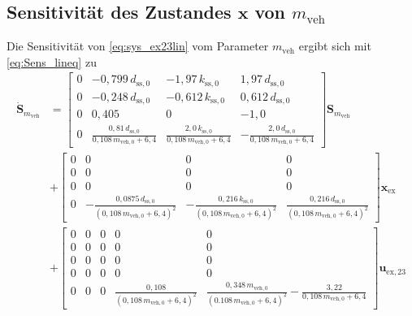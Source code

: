 \subsection{Sensitivität des Zustandes $\pmb{x}$ von $m_\mathrm{veh}$}
Die Sensitivität von \eqref{eq:sys_ex23lin} vom Parameter $m_\mathrm{veh}$ ergibt sich mit \eqref{eq:Sens_lineq} zu
\begin{align}
\dot{\pmb{S}}_{m_\mathrm{veh}} &= \begin{bmatrix} 0 & -0,799\, d_\mathrm{ss,0} & -1,97\, k_\mathrm{ss,0} & 1,97\, d_\mathrm{ss,0} \\ 0 & -0,248\, d_\mathrm{ss,0} & -0,612\, k_\mathrm{ss,0} & 0,612\, d_\mathrm{ss,0} \\ 0 & 0,405 & 0 & -1,0 \\ 0 & \frac{0,81\, d_\mathrm{ss,0}}{0,108 \, m_\mathrm{veh,0} + 6,4} & \frac{2,0\, k_\mathrm{ss,0}}{0,108\, m_\mathrm{veh,0} + 6,4} & -\frac{2,0\, d_\mathrm{ss,0}}{0,108\, m_\mathrm{veh,0}+6,4}\end{bmatrix} \pmb{S}_{m_\mathrm{veh}}\\
&+\begin{bmatrix} 0 & 0 & 0 & 0\\ 0 & 0 & 0 & 0\\ 0 & 0 & 0 & 0\\ 0 & -\frac{0,0875\, d_\mathrm{ss,0}}{(0,108\, m_\mathrm{veh,0} + 6,4)^2} & -\frac{0,216\, k_\mathrm{ss,0}}{(0,108\, m_\mathrm{veh,0} + 6,4)^2} & \frac{0,216\, d_\mathrm{ss,0}}{(0,108\, m_\mathrm{veh,0} + 6,4)^2}\end{bmatrix}\pmb{x}_\mathrm{ex}\\
&+\begin{bmatrix}0 & 0 & 0 & 0 & 0\\ 0 & 0 & 0 & 0 & 0\\ 0 & 0 & 0 & 0 & 0\\ 0 & 0 & 0 & 0 & 0\\
0 & 0 & 0 & \frac{0,108}{(0,108\, m_\mathrm{veh,0} + 6,4)^2} & \frac{0,348\, m_\mathrm{veh,0}}{(0.108\, m_\mathrm{veh,0} + 6,4)^2} - \frac{3,22}{0,108\, m_\mathrm{veh,0} + 6,4}\end{bmatrix} \pmb{u}_\mathrm{ex,23}
\end{align}


